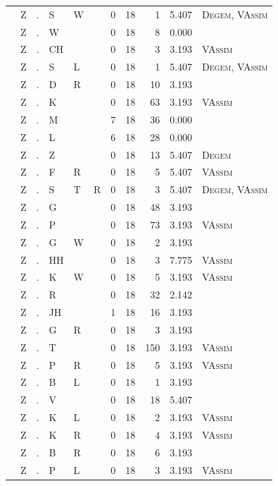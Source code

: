 \documentclass[12pt]{article}
\begin{document}
\begin{longtable}{r@{ } r@{ } c@{ } l@{ } l@{ } l@{ } r r r r l }
 & Z & . & S & W &  & 0 & 18 & 1 & 5.407 & \textsc{Degem}, \textsc{VAssim} \\
 & Z & . & W &  &  & 0 & 18 & 8 & 0.000 &  \\
 & Z & . & CH &  &  & 0 & 18 & 3 & 3.193 & \textsc{VAssim} \\
 & Z & . & S & L &  & 0 & 18 & 1 & 5.407 & \textsc{Degem}, \textsc{VAssim} \\
 & Z & . & D & R &  & 0 & 18 & 10 & 3.193 &  \\
 & Z & . & K &  &  & 0 & 18 & 63 & 3.193 & \textsc{VAssim} \\
 & Z & . & M &  &  & 7 & 18 & 36 & 0.000 &  \\
 & Z & . & L &  &  & 6 & 18 & 28 & 0.000 &  \\
 & Z & . & Z &  &  & 0 & 18 & 13 & 5.407 & \textsc{Degem} \\
 & Z & . & F & R &  & 0 & 18 & 5 & 5.407 & \textsc{VAssim} \\
 & Z & . & S & T & R & 0 & 18 & 3 & 5.407 & \textsc{Degem}, \textsc{VAssim} \\
 & Z & . & G &  &  & 0 & 18 & 48 & 3.193 &  \\
 & Z & . & P &  &  & 0 & 18 & 73 & 3.193 & \textsc{VAssim} \\
 & Z & . & G & W &  & 0 & 18 & 2 & 3.193 &  \\
 & Z & . & HH &  &  & 0 & 18 & 3 & 7.775 & \textsc{VAssim} \\
 & Z & . & K & W &  & 0 & 18 & 5 & 3.193 & \textsc{VAssim} \\
 & Z & . & R &  &  & 0 & 18 & 32 & 2.142 &  \\
 & Z & . & JH &  &  & 1 & 18 & 16 & 3.193 &  \\
 & Z & . & G & R &  & 0 & 18 & 3 & 3.193 &  \\
 & Z & . & T &  &  & 0 & 18 & 150 & 3.193 & \textsc{VAssim} \\
 & Z & . & P & R &  & 0 & 18 & 5 & 3.193 & \textsc{VAssim} \\
 & Z & . & B & L &  & 0 & 18 & 1 & 3.193 &  \\
 & Z & . & V &  &  & 0 & 18 & 18 & 5.407 &  \\
 & Z & . & K & L &  & 0 & 18 & 2 & 3.193 & \textsc{VAssim} \\
 & Z & . & K & R &  & 0 & 18 & 4 & 3.193 & \textsc{VAssim} \\
 & Z & . & B & R &  & 0 & 18 & 6 & 3.193 &  \\
 & Z & . & P & L &  & 0 & 18 & 3 & 3.193 & \textsc{VAssim} \\

\end{longtable}
\end{document}
